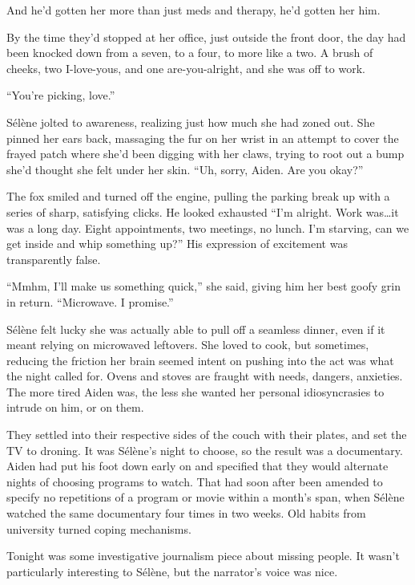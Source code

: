 And he'd gotten her more than just meds and therapy, he'd gotten her him.

By the time they'd stopped at her office, just outside the front door, the day had been knocked down from a seven, to a four, to more like a two. A brush of cheeks, two I-love-yous, and one are-you-alright, and she was off to work.

\secdiv{}

\noindent ``You're picking, love.''

Sélène jolted to awareness, realizing just how much she had zoned out. She pinned her ears back, massaging the fur on her wrist in an attempt to cover the frayed patch where she'd been digging with her claws, trying to root out a bump she'd thought she felt under her skin. ``Uh, sorry, Aiden. Are you okay?''

The fox smiled and turned off the engine, pulling the parking break up with a series of sharp, satisfying clicks. He looked exhausted ``I'm alright. Work was\ldots{}it was a long day. Eight appointments, two meetings, no lunch. I'm starving, can we get inside and whip something up?'' His expression of excitement was transparently false.

``Mmhm, I'll make us something quick,'' she said, giving him her best goofy grin in return. ``Microwave. I promise.''

Sélène felt lucky she was actually able to pull off a seamless dinner, even if it meant relying on microwaved leftovers. She loved to cook, but sometimes, reducing the friction her brain seemed intent on pushing into the act was what the night called for. Ovens and stoves are fraught with needs, dangers, anxieties. The more tired Aiden was, the less she wanted her personal idiosyncrasies to intrude on him, or on them.

They settled into their respective sides of the couch with their plates, and set the TV to droning. It was Sélène's night to choose, so the result was a documentary. Aiden had put his foot down early on and specified that they would alternate nights of choosing programs to watch. That had soon after been amended to specify no repetitions of a program or movie within a month's span, when Sélène watched the same documentary four times in two weeks. Old habits from university turned coping mechanisms.

Tonight was some investigative journalism piece about missing people. It wasn't particularly interesting to Sélène, but the narrator's voice was nice.

